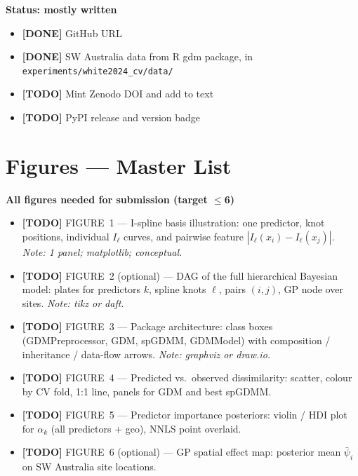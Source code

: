 \documentclass[11pt,a4paper]{article}
\newcommand{\done}[1]{{\color{donegreen}\textbf{[DONE]} #1}}
\newcommand{\todo}[1]{{\color{todored}\textbf{[TODO]} #1}}
\newcommand{\note}[1]{{\color{notegray}\textit{Note: #1}}}
\newenvironment{scaffold}[1]{%
  \begin{mdframed}[backgroundcolor=gray!6, linecolor=gray!30,
                   leftmargin=0pt, rightmargin=0pt,
                   innerleftmargin=8pt, innerrightmargin=8pt,
                   innertopmargin=6pt, innerbottommargin=6pt]
  \noindent\textbf{#1}\par\vspace{2pt}
  \begin{itemize}[leftmargin=1.4em, topsep=2pt, itemsep=1pt, parsep=0pt]
}{%
  \end{itemize}
  \end{mdframed}
  \vspace{4pt}
}
\begin{document}
\begin{scaffold}{Status: mostly written}
  \item \done{GitHub URL}
  \item \done{SW Australia data from R gdm package, in \texttt{experiments/white2024\_cv/data/}}
  \item \todo{Mint Zenodo DOI and add to text}
  \item \todo{PyPI release and version badge}
\end{scaffold}


\section{Figures --- Master List}

\begin{scaffold}{All figures needed for submission (target $\leq$6)}
  \item \todo{FIGURE~1 --- I-spline basis illustration: one predictor, knot
    positions, individual $I_\ell$ curves, and pairwise feature
    $|I_\ell(x_i) - I_\ell(x_j)|$. \note{1 panel; matplotlib; conceptual.}}

  \item \todo{FIGURE~2 (optional) --- DAG of the full hierarchical Bayesian
    model: plates for predictors $k$, spline knots $\ell$, pairs $(i,j)$,
    GP node over sites. \note{tikz or daft.}}

  \item \todo{FIGURE~3 --- Package architecture: class boxes
    (GDMPreprocessor, GDM, spGDMM, GDMModel) with composition /
    inheritance / data-flow arrows. \note{graphviz or draw.io.}}

  \item \todo{FIGURE~4 --- Predicted vs.\ observed dissimilarity: scatter,
    colour by CV fold, 1:1 line, panels for GDM and best spGDMM.}

  \item \todo{FIGURE~5 --- Predictor importance posteriors: violin / HDI plot
    for $\alpha_k$ (all predictors + geo), NNLS point overlaid.}

  \item \todo{FIGURE~6 (optional) --- GP spatial effect map: posterior mean
    $\bar\psi_i$ on SW Australia site locations.}
\end{scaffold}
\end{document}

